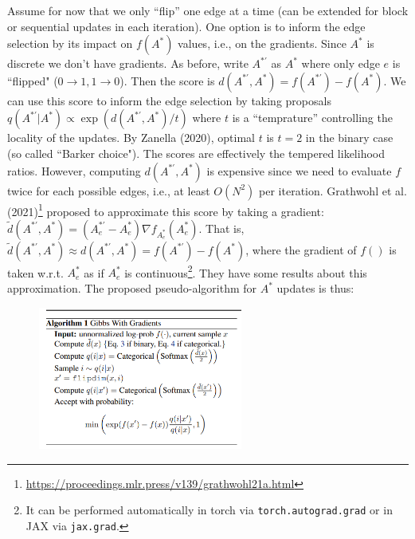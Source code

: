 \documentclass[12pt]{article}
\begin{document}
\begin{enumerate}
            Assume for now that we only ``flip'' one edge at a time 
            (can be extended for block or sequential updates in each iteration).
            One option is to inform the edge selection by its impact on $f(A^\ast)$ values,
            i.e., on the gradients. Since $A^\ast$ is discrete we don't have gradients.
            As before, write $A^{\ast'}$ as $A^\ast$ where only edge $e$ is ``flipped" ($0\to 1, 1\to 0$).
            Then the score is $d(A^{\ast'},A^\ast) = f(A^{\ast'}) - f(A^\ast)$.
            We can use this score to inform the edge selection by taking proposals 
            $q(A^{\ast'} \vert A^\ast) \propto \exp(d(A^{\ast'},A^\ast)/t)$ where $t$ is a 
            ``temprature'' controlling the locality of the updates. 
            By Zanella (2020), optimal $t$ is $t=2$ in the binary case (so called ``Barker choice").
            The scores are 
            effectively the tempered likelihood ratios.
            However, computing $d(A^{\ast'},A^\ast)$ is expensive since we need to evaluate $f$ twice
            for each possible edges, i.e., at least $O(N^2)$ per iteration. 
            Grathwohl et al. (2021)\footnote{\url{https://proceedings.mlr.press/v139/grathwohl21a.html}}
            proposed to approximate this score by taking 
            a gradient:
            $\widetilde{d}(A^{\ast'},A^\ast) = (A^{\ast'}_e - A^{\ast}_e)\nabla f_{A^\ast_e}(A^\ast_e)$.
            That is, $\widetilde{d}(A^{\ast'},A^\ast) \approx d(A^{\ast'},A^\ast) = f(A^{\ast'}) - f(A^\ast)$,
            where the gradient of $f()$ is taken w.r.t. $A^\ast_e$ as if $A^\ast_e$ is 
            continuous\footnote{It can be performed automatically in torch via \texttt{torch.autograd.grad} or in 
            JAX via \texttt{jax.grad}.}.
            They have some results about this approximation.
            The proposed pseudo-algorithm for $A^\ast$ updates is thus:

            \begin{figure}[!ht]
                \centering
                \includegraphics[width=0.6\textwidth]{gwg.png}
            \end{figure}


\end{enumerate}
\end{document}
